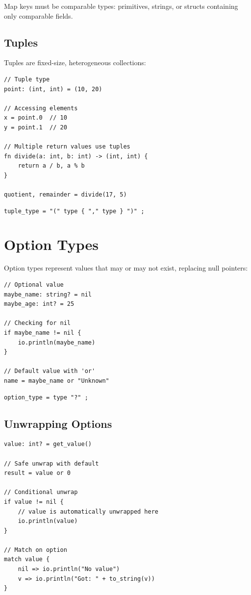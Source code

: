 \begin{note}
Map keys must be comparable types: primitives, strings, or structs containing only comparable fields.
\end{note}

\subsection{Tuples}

Tuples are fixed-size, heterogeneous collections:

\begin{lstlisting}
// Tuple type
point: (int, int) = (10, 20)

// Accessing elements
x = point.0  // 10
y = point.1  // 20

// Multiple return values use tuples
fn divide(a: int, b: int) -> (int, int) {
    return a / b, a % b
}

quotient, remainder = divide(17, 5)
\end{lstlisting}

\begin{lstlisting}[language=EBNF]
tuple_type = "(" type { "," type } ")" ;
\end{lstlisting}

\section{Option Types}

Option types represent values that may or may not exist, replacing null pointers:

\begin{lstlisting}
// Optional value
maybe_name: string? = nil
maybe_age: int? = 25

// Checking for nil
if maybe_name != nil {
    io.println(maybe_name)
}

// Default value with 'or'
name = maybe_name or "Unknown"
\end{lstlisting}

\begin{lstlisting}[language=EBNF]
option_type = type "?" ;
\end{lstlisting}

\subsection{Unwrapping Options}

\begin{lstlisting}
value: int? = get_value()

// Safe unwrap with default
result = value or 0

// Conditional unwrap
if value != nil {
    // value is automatically unwrapped here
    io.println(value)
}

// Match on option
match value {
    nil => io.println("No value")
    v => io.println("Got: " + to_string(v))
}
\end{lstlisting}

